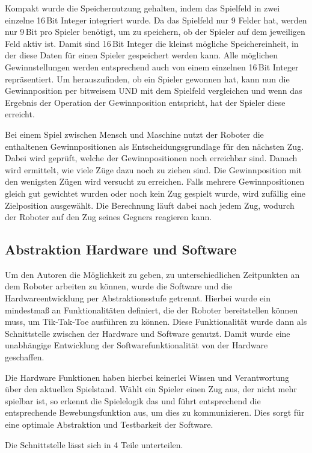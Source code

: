 \documentclass[conference,compsoc,final,a4paper]{IEEEtran}
\begin{document}
Kompakt wurde die Speichernutzung gehalten, indem das Spielfeld in zwei einzelne 16\,Bit Integer integriert wurde.
Da das Spielfeld nur 9 Felder hat, werden nur 9\,Bit pro Spieler benötigt, um zu speichern, ob der Spieler
auf dem jeweiligen Feld aktiv ist. Damit sind 16\,Bit Integer die kleinst mögliche Speichereinheit, in der
diese Daten für einen Spieler gespeichert werden kann. Alle möglichen Gewinnstellungen werden entsprechend
auch von einem einzelnen 16\,Bit Integer repräsentiert. Um herauszufinden, ob ein Spieler gewonnen hat, kann
nun die Gewinnposition per bitweisem UND mit dem Spielfeld vergleichen und wenn das Ergebnis der Operation
der Gewinnposition entspricht, hat der Spieler diese erreicht.

Bei einem Spiel zwischen Mensch und Maschine nutzt der Roboter die enthaltenen Gewinnpositionen als
Entscheidungsgrundlage für den nächsten Zug. Dabei wird geprüft, welche der Gewinnpositionen noch erreichbar
sind. Danach wird ermittelt, wie viele Züge dazu noch zu ziehen sind. Die Gewinnposition mit den
wenigsten Zügen wird versucht zu erreichen. Falls mehrere Gewinnpositionen gleich gut gewichtet wurden
oder noch kein Zug gespielt wurde, wird zufällig eine Zielposition ausgewählt. Die Berechnung läuft
dabei nach jedem Zug, wodurch der Roboter auf den Zug seines Gegners reagieren kann.

\subsection{Abstraktion Hardware und Software}

Um den Autoren die Möglichkeit zu geben, zu unterschiedlichen Zeitpunkten an dem Roboter arbeiten
zu können, wurde die Software und die Hardwareentwicklung per Abstraktionsstufe getrennt. Hierbei wurde
ein mindestmaß an Funktionalitäten definiert, die der Roboter bereitstellen können muss, um Tik-Tak-Toe
ausführen zu können. Diese Funktionalität wurde dann als Schnittstelle zwischen der Hardware und Software
genutzt. Damit wurde eine unabhängige Entwicklung der Softwarefunktionalität von der Hardware geschaffen.

Die Hardware Funktionen haben hierbei keinerlei Wissen und Verantwortung über den aktuellen Spielstand.
Wählt ein Spieler einen Zug aus, der nicht mehr spielbar ist, so erkennt die Spielelogik das und führt
entsprechend die entsprechende Bewebungsfunktion aus, um dies zu kommunizieren. Dies sorgt für eine
optimale Abstraktion und Testbarkeit der Software.

Die Schnittstelle lässt sich in 4 Teile unterteilen.
\end{document}
